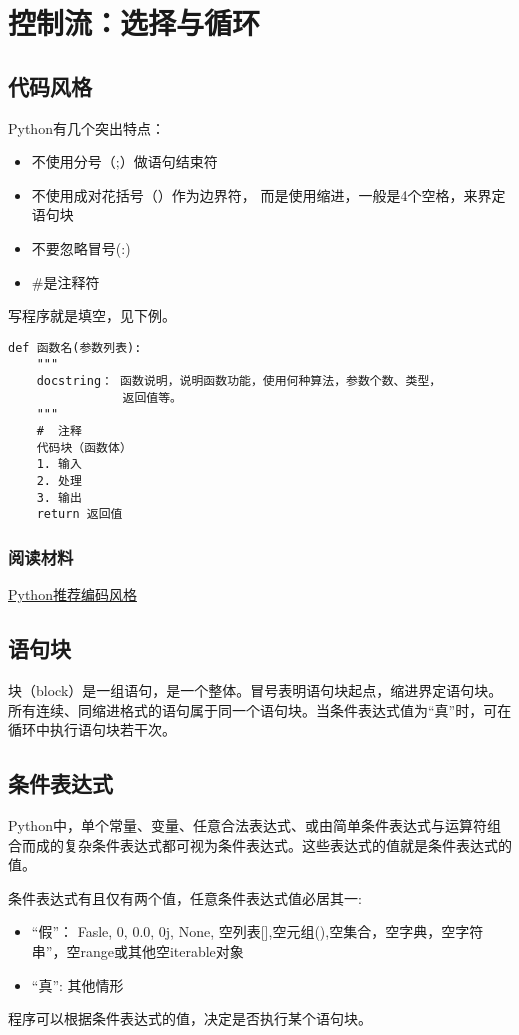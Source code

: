 \chapter{控制流：选择与循环}

\section{代码风格}
Python有几个突出特点：
\begin{itemize}
  \item 不使用分号（;）做语句结束符
  \item 不使用成对花括号（{}）作为边界符， 而是使用缩进，一般是4个空格，来界定语句块
  \item 不要忽略冒号(:)
  \item \#是注释符
\end{itemize}
写程序就是填空，见下例。
\begin{verbatim}
def 函数名(参数列表):
    """
    docstring： 函数说明，说明函数功能，使用何种算法，参数个数、类型，
                返回值等。
    """
    #  注释
    代码块（函数体）
    1. 输入
    2. 处理
    3. 输出
    return 返回值
\end{verbatim}
\subsection{阅读材料}
\href{https://www.python.org/dev/peps/pep-0008/}{Python推荐编码风格}

\section{语句块}
块（block）是一组语句，是一个整体。冒号表明语句块起点，缩进界定语句块。所有连续、同缩进格式的语句属于同一个语句块。当条件表达式值为“真”时，可在循环中执行语句块若干次。

\section{条件表达式}
Python中，单个常量、变量、任意合法表达式、或由简单条件表达式与运算符组合而成的复杂条件表达式都可视为条件表达式。这些表达式的值就是条件表达式的值。

条件表达式有且仅有两个值，任意条件表达式值必居其一:
\begin{itemize}
\item ``假''： Fasle, 0, 0.0, 0j, None, 空列表[],空元组(),空集合，空字典{}，空字符串''，空range或其他空iterable对象
\item ``真'': 其他情形
\end{itemize}
程序可以根据条件表达式的值，决定是否执行某个语句块。
